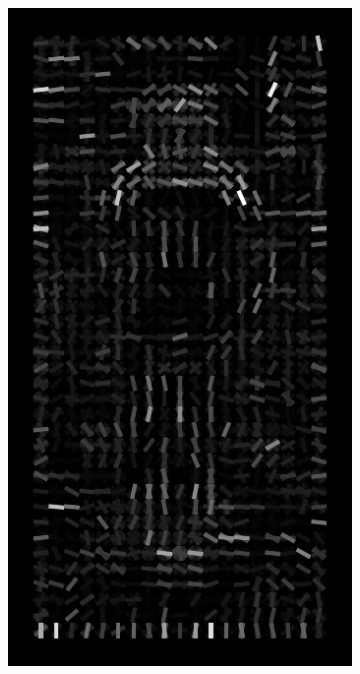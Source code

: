\documentclass[thesis.tex]{subfiles}
\begin{document}
\begin{figure}[tb]
{\begin{subfigure}[t]{0.17\textwidth}
		\includegraphics[width=\textwidth]{img/inriaExampleDescriptorSvm.pdf}
		\caption{}
		\label{fig:inriaExampleDescriptorSvm}
		\vspace{2mm}
	\end{subfigure}
	\begin{subfigure}[t]{0.17\textwidth}

\end{subfigure}}
\end{figure}
\end{document}
